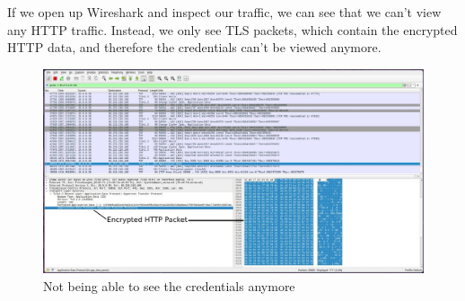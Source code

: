 \documentclass[a4paper]{article}
\begin{document}
\newpage
If we open up Wireshark and inspect our traffic, we can see that we can't view any HTTP traffic. Instead, we only see TLS packets, which contain the encrypted HTTP data, and therefore the credentials can't be viewed anymore.
\begin{figure}[!htbp]
	\includegraphics[scale=0.2]{images/nohaxxor.png}
	\centering
	\caption{Not being able to see the credentials anymore}
\end{figure}
\end{document}

